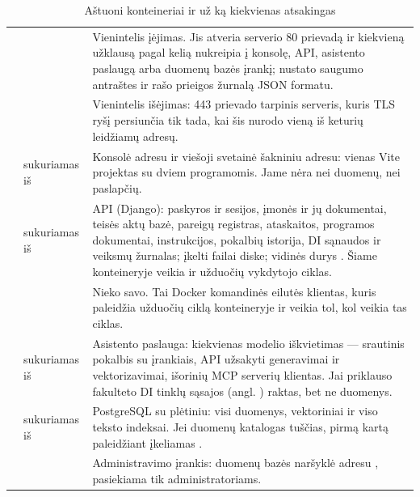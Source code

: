 \begin{table}[H]
\caption{Aštuoni  konteineriai ir už ką kiekvienas atsakingas}\label{tab:arch:containers}
\begin{tabularx}{\textwidth}{@{}L{36mm}L{33mm}Y@{}}
\toprule
{} &  &  \\
\midrule
{} &  & Vienintelis įėjimas. Jis atveria serverio 80 prievadą ir kiekvieną užklausą pagal kelią nukreipia į konsolę, API, asistento paslaugą arba duomenų bazės įrankį; nustato saugumo antraštes ir rašo prieigos žurnalą JSON formatu. \\
 &  & Vienintelis išėjimas: 443 prievado tarpinis serveris, kuris TLS ryšį persiunčia tik tada, kai šis nurodo vieną iš keturių leidžiamų adresų. \\
 & sukuriamas iš  & Konsolė adresu  ir viešoji svetainė šakniniu adresu: vienas Vite projektas su dviem programomis. Jame nėra nei duomenų, nei paslapčių. \\
 & sukuriamas iš  & API (Django): paskyros ir sesijos, įmonės ir jų dokumentai, teisės aktų bazė, pareigų registras, ataskaitos, programos dokumentai, instrukcijos, pokalbių istorija, DI sąnaudos ir veiksmų žurnalas; įkelti failai diske; vidinės durys . Šiame konteineryje veikia ir užduočių vykdytojo ciklas. \\
 &  & Nieko savo. Tai Docker komandinės eilutės klientas, kuris paleidžia užduočių ciklą  konteineryje ir veikia tol, kol veikia tas ciklas. \\
 & sukuriamas iš  & Asistento paslauga: kiekvienas modelio iškvietimas --- srautinis pokalbis su įrankiais, API užsakyti generavimai ir vektorizavimai, išorinių MCP serverių klientas. Jai priklauso fakulteto DI tinklų sąsajos (angl. ) raktas, bet ne duomenys. \\
 & sukuriamas iš  & PostgreSQL su  plėtiniu: visi duomenys, vektoriniai ir viso teksto indeksai. Jei duomenų katalogas tuščias, pirmą kartą paleidžiant įkeliamas . \\
 &  & Administravimo įrankis: duomenų bazės naršyklė adresu , pasiekiama tik administratoriams. \\
\bottomrule
\end{tabularx}
\end{table}

